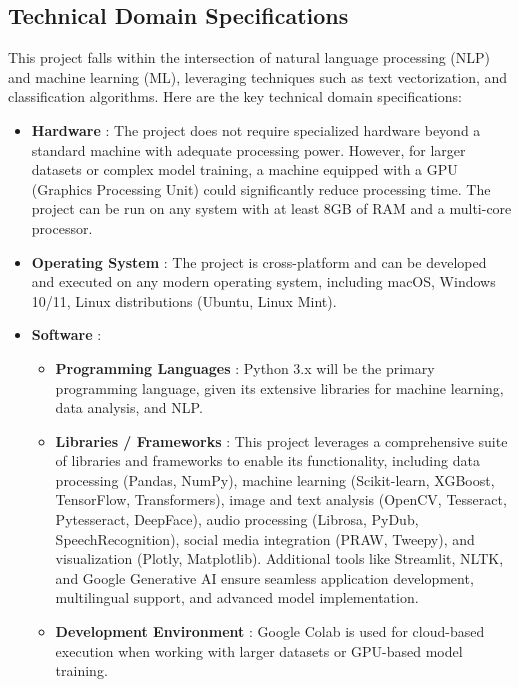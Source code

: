 \subsection{Technical Domain Specifications}
\vspace{.1in}
This project falls within the intersection of natural language processing (NLP) and machine learning (ML), leveraging techniques such as text vectorization, and classification algorithms. Here are the key technical domain specifications:

\begin{itemize}
    
    \item \textbf{Hardware} : 
    \noindent
    The project does not require specialized hardware beyond a standard machine with adequate processing power. However, for larger datasets or complex model training, a machine equipped with a GPU (Graphics Processing Unit) could significantly reduce processing time. The project can be run on any system with at least 8GB of RAM and a multi-core processor.

    \item \textbf{Operating System} : 
    \noindent
    The project is cross-platform and can be developed and executed on any modern operating system, including macOS, Windows 10/11, Linux distributions (Ubuntu, Linux Mint). 

    \item  \textbf{Software} :
    \noindent
        \begin{itemize}
            \item \textbf{Programming Languages} : 
            \noindent
            Python 3.x will be the primary programming language, given its extensive libraries for machine learning, data analysis, and NLP.

            \item \textbf{Libraries / Frameworks} :
            \noindent
            This project leverages a comprehensive suite of libraries and frameworks to enable its functionality, including data processing (Pandas, NumPy), machine learning (Scikit-learn, XGBoost, TensorFlow, Transformers), image and text analysis (OpenCV, Tesseract, Pytesseract, DeepFace), audio processing (Librosa, PyDub, SpeechRecognition), social media integration (PRAW, Tweepy), and visualization (Plotly, Matplotlib). Additional tools like Streamlit, NLTK, and Google Generative AI ensure seamless application development, multilingual support, and advanced model implementation.    

            \item \textbf{Development Environment} :
            \noindent
            Google Colab is used for cloud-based execution when working with larger datasets or GPU-based model training.
                

                
        \end{itemize}
    
\end{itemize}

